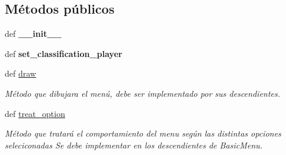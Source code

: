 \subsection*{\-Métodos públicos}
\begin{DoxyCompactItemize}
\item 
\hypertarget{classengine_1_1classificationmenu_1_1ChampionShipCompleted_aa85e81d50088b86dc62e86009edbf13b}{
def {\bfseries \-\_\-\-\_\-init\-\_\-\-\_\-}}
\label{classengine_1_1classificationmenu_1_1ChampionShipCompleted_aa85e81d50088b86dc62e86009edbf13b}

\item 
\hypertarget{classengine_1_1classificationmenu_1_1ChampionShipCompleted_a07579fd9ded9c31896ccab831f8e5f28}{
def {\bfseries set\-\_\-classification\-\_\-player}}
\label{classengine_1_1classificationmenu_1_1ChampionShipCompleted_a07579fd9ded9c31896ccab831f8e5f28}

\item 
\hypertarget{classengine_1_1classificationmenu_1_1ChampionShipCompleted_ab04a78dd51ac629f29299c4b6e749e32}{
def \hyperlink{classengine_1_1classificationmenu_1_1ChampionShipCompleted_ab04a78dd51ac629f29299c4b6e749e32}{draw}}
\label{classengine_1_1classificationmenu_1_1ChampionShipCompleted_ab04a78dd51ac629f29299c4b6e749e32}

\begin{DoxyCompactList}\small\item\em \-Método que dibujara el menú, debe ser implementado por sus descendientes. \end{DoxyCompactList}\item 
\hypertarget{classengine_1_1classificationmenu_1_1ChampionShipCompleted_a595394a019edfd1aa7e711934543275b}{
def \hyperlink{classengine_1_1classificationmenu_1_1ChampionShipCompleted_a595394a019edfd1aa7e711934543275b}{treat\-\_\-option}}
\label{classengine_1_1classificationmenu_1_1ChampionShipCompleted_a595394a019edfd1aa7e711934543275b}

\begin{DoxyCompactList}\small\item\em \-Método que tratará el comportamiento del menu según las distintas opciones seleciconadas \-Se debe implementar en los descendientes de \-Basic\-Menu. \end{DoxyCompactList}\end{DoxyCompactItemize}
